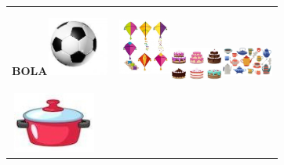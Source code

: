 \begin{longtable}[]{@{}ll@{}}
\toprule
\textbf{BOLA}\includegraphics[width=0.81250in,height=0.75903in]{media/image49.jpg}
&
\includegraphics[width=0.67361in,height=1.02083in]{media/image50.jpg}\includegraphics[width=0.68472in,height=0.56389in]{media/image51.jpg}\includegraphics[width=0.67014in,height=0.61944in]{media/image52.jpg}\tabularnewline
\begin{minipage}[t]{0.48\columnwidth}\raggedright\strut
\includegraphics[width=1.12431in,height=0.78125in]{media/image53.jpg}


\end{minipage}
\end{longtable}
